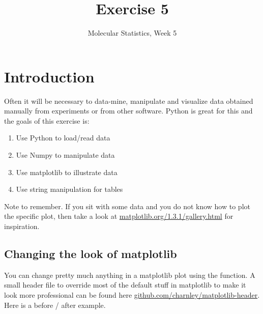 \documentclass{article}
\title{Exercise 5}
\author{Molecular Statistics, Week 5}
\date{}
\begin{document}

\maketitle

\section{Introduction}

Often it will be necessary to data-mine, manipulate and visualize data obtained manually from experiments or from other software.
Python is great for this and the goals of this exercise is:

\begin{enumerate}
    \item Use Python to load/read data

    \item Use Numpy to manipulate data

    \item Use matplotlib to illustrate data

    \item Use string manipulation for tables

\end{enumerate}


Note to remember.
If you sit with some data and you do not know how to plot the specific plot, then take a look at
\href{http://matplotlib.org/1.3.1/gallery.html}{matplotlib.org/1.3.1/gallery.html} for inspiration.



\subsection{Changing the look of matplotlib}
You can change pretty much anything in a matplotlib plot using the  function.
A small header file to override most of the default stuff in matplotlib to make it look more professional can be found here
\href{https://github.com/charnley/matplotlib-header}{github.com/charnley/matplotlib-header}.
Here is a before / after example.
\end{document}
